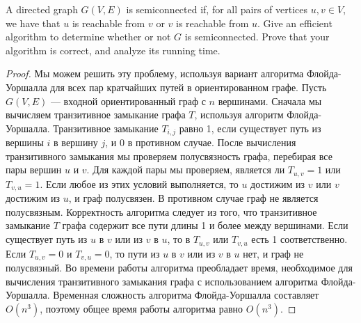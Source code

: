 \begin{prob}
A directed graph $G(V, E)$ is semiconnected if, for all pairs of vertices $u, v \in V$, we have that $u$ is reachable from $v$ or $v$ is reachable from $u$. Give an efficient algorithm to determine whether or not $G$ is semiconnected. Prove that your algorithm is correct, and analyze its running time.
\end{prob}
\vskip 0.2in
\begin{proof}
Мы можем решить эту проблему, используя вариант алгоритма Флойда-Уоршалла для всех пар кратчайших путей в ориентированном графе.
\vskip 0.1in
Пусть $G(V,E)$ — входной ориентированный граф с $n$ вершинами. Сначала мы вычисляем транзитивное замыкание графа $T$, используя алгоритм Флойда-Уоршалла. Транзитивное замыкание $T_{i,j}$ равно 1, если существует путь из вершины $i$ в вершину $j$, и 0 в противном случае.
\vskip 0.1in
После вычисления транзитивного замыкания мы проверяем полусвязность графа, перебирая все пары вершин $u$ и $v$. Для каждой пары мы проверяем, является ли $T_{u,v} = 1$ или $T_{v,u} = 1$. Если любое из этих условий выполняется, то $u$ достижим из $v$ или $v$ достижим из $u$, и граф полусвязен. В противном случае граф не является полусвязным.
\vskip 0.1in
Корректность алгоритма следует из того, что транзитивное замыкание $T$ графа содержит все пути длины 1 и более между вершинами. Если существует путь из $u$ в $v$ или из $v$ в $u$, то в $T_{u,v}$ или $T_{v,u}$ есть 1 соответственно. Если $T_{u,v} = 0$ и $T_{v,u} = 0$, то пути из $u$ в $v$ или из $v$ в $u$ нет, и граф не полусвязный.
\vskip 0.1in
Во времени работы алгоритма преобладает время, необходимое для вычисления транзитивного замыкания графа с использованием алгоритма Флойда-Уоршалла. Временная сложность алгоритма Флойда-Уоршалла составляет $O(n^3)$, поэтому общее время работы алгоритма равно $O(n^3)$.
\end{proof}
\vskip 0.6in

